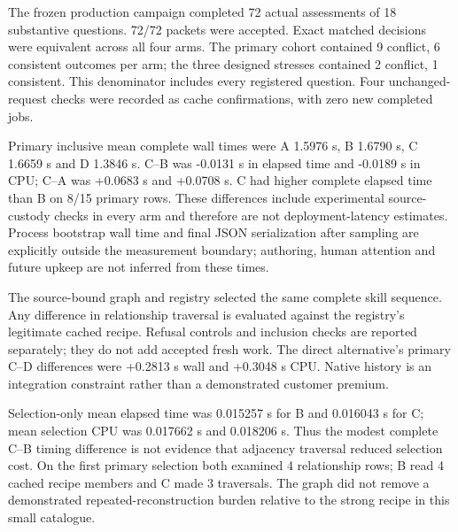 
The frozen production campaign completed 72 actual assessments of 18 substantive questions. 72/72 packets were accepted. Exact matched decisions were equivalent across all four arms. The primary cohort contained 9 conflict, 6 consistent outcomes per arm; the three designed stresses contained 2 conflict, 1 consistent. This denominator includes every registered question. Four unchanged-request checks were recorded as cache confirmations, with zero new completed jobs.

Primary inclusive mean complete wall times were A 1.5976 s, B 1.6790 s, C 1.6659 s and D 1.3846 s. C--B was -0.0131 s in elapsed time and -0.0189 s in CPU; C--A was +0.0683 s and +0.0708 s. C had higher complete elapsed time than B on 8/15 primary rows. These differences include experimental source-custody checks in every arm and therefore are not deployment-latency estimates. Process bootstrap wall time and final JSON serialization after sampling are explicitly outside the measurement boundary; authoring, human attention and future upkeep are not inferred from these times.

The source-bound graph and registry selected the same complete skill sequence. Any difference in relationship traversal is evaluated against the registry's legitimate cached recipe. Refusal controls and inclusion checks are reported separately; they do not add accepted fresh work. The direct alternative's primary C--D differences were +0.2813 s wall and +0.3048 s CPU. Native history is an integration constraint rather than a demonstrated customer premium.

Selection-only mean elapsed time was 0.015257 s for B and 0.016043 s for C; mean selection CPU was 0.017662 s and 0.018206 s. Thus the modest complete C--B timing difference is not evidence that adjacency traversal reduced selection cost. On the first primary selection both examined 4 relationship rows; B read 4 cached recipe members and C made 3 traversals. The graph did not remove a demonstrated repeated-reconstruction burden relative to the strong recipe in this small catalogue.
